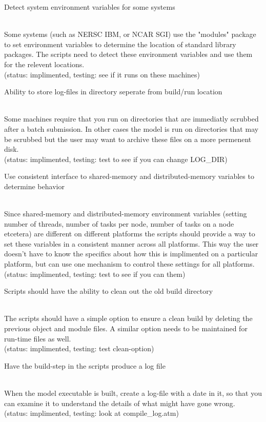 \documentclass[]{article}
\begin{document}
\begin{enumerate}
{\bf\em \item Detect system environment variables for some systems} \\
Some systems (such as NERSC IBM, or NCAR SGI) use the "modules" package to set environment
variables to determine the location of standard library packages. The scripts need
to detect these environment variables and use them for the relevent locations.
\\
(status: implimented, testing: see if it runs on these machines)

{\bf\em \item Ability to store log-files in directory seperate from build/run location} \\
Some machines require that you run on directories that are immediatly scrubbed after
a batch submission. In other cases the model is run on directories that may be scrubbed
but the user may want to archive these files on a more permenent disk.
\\
(status: implimented, testing: test to see if you can change LOG\_DIR)

{\bf\em \item Use consistent interface to shared-memory and distributed-memory variables to
determine behavior} \\
Since shared-memory and distributed-memory environment variables (setting number of
threads, number of tasks per node, number of tasks on a node etcetera) are different on
different platforms the scripts should provide a way to set these variables in a 
consistent manner across all platforms. This way the user doesn't have to know the specifics
about how this is implimented on a particular platform, but can use one mechanism to control
these settings for all platforms.
\\
(status: implimented, testing: test to see if you can them)

{\bf\em \item Scripts should have the ability to clean out the old build directory} \\
The scripts should have a simple option to ensure a clean build by deleting the previous
object and module files. A similar option needs to be maintained for run-time files
as well.
\\
(status: implimented, testing: test clean-option)

{\bf\em \item Have the build-step in the scripts produce a log file} \\
When the model executable is built, create a log-file with a date in it, so
that you can examine it to understand the details of what might have gone wrong.
\\
(status: implimented, testing: look at compile\_log.atm)


\end{enumerate}
\end{document}
